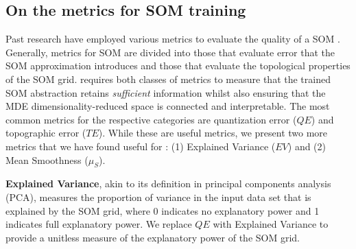\subsection{On the metrics for SOM training}\label{ssec:som_training_metrics}
Past research have employed various metrics to evaluate the quality of a SOM \cite{forest2020survey}.
%
Generally, metrics for SOM are divided into those that evaluate error that the SOM approximation introduces and those that evaluate the topological properties of the SOM grid.
%
\ClimateSOM requires both classes of metrics to measure that the trained SOM abstraction retains \textit{sufficient} information whilst also ensuring that the MDE dimensionality-reduced space is connected and interpretable.
%
The most common metrics for the respective categories are quantization error ($QE$) and topographic error ($TE$).
%
%
%
While these are useful metrics, we present two more metrics that we have found useful for \ClimateSOM: (1) Explained Variance ($EV$) and (2) Mean Smoothness ($\mu_S$).

\noindent
\textbf{Explained Variance}, akin to its definition in principal components analysis (PCA), measures the proportion of variance in the input data set that is explained by the SOM grid, where 0 indicates no explanatory power and 1 indicates full explanatory power.
We replace $QE$ with Explained Variance to provide a unitless measure of the explanatory power of the SOM grid.

